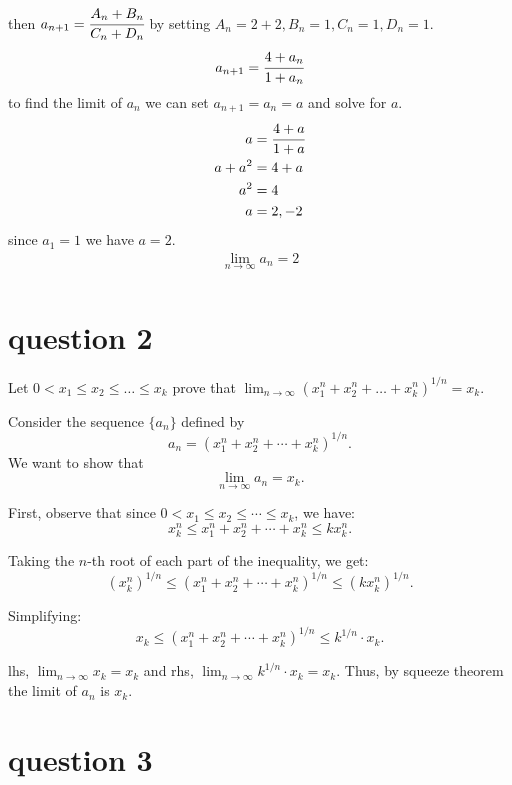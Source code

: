 \documentclass{article}
\begin{document}
    then $a_{n + 1} = \cfrac{A_n + B_n}{C_n + D_n}$ by setting $A_n = 2 + 2, B_n = 1, C_n = 1, D_n = 1$.
    \begin{align*}
        a_{n+1} &= \cfrac{4 + a_n}{1 + a_n} \\
    \end{align*}
    to find the limit of $a_n$ we can set $a_{n+1} = a_n = a$ and solve for $a$.
    \begin{align*}
        a &= \cfrac{4 + a}{1 + a} \\
        a + a^2 &= 4 + a \\
        a^2 &= 4 \\
        a &= 2, -2 \\
    \end{align*}
    since $a_1 = 1$ we have $a = 2$.
    \begin{align*}
        \lim_{n \to \infty} a_n = 2 \\
    \end{align*}

\section{question 2}


Let $0 < x_1 \leq x_2 \leq \dots \leq x_k$ prove that $\lim_{n \to \infty} (x_{1}^n + x_{2}^n + \dots + x_{k}^n)^{1/n} = x_k$.
\begin{proofbox}
    Consider the sequence \(\{a_n\}\) defined by
    \[
    a_n = (x_1^n + x_2^n + \cdots + x_k^n)^{1/n}.
    \]
    We want to show that
    \[
    \lim_{n \to \infty} a_n = x_k.
    \]
    
    First, observe that since \(0 < x_1 \leq x_2 \leq \cdots \leq x_k\), we have:
    \[
    x_k^n \leq x_1^n + x_2^n + \cdots + x_k^n \leq kx_k^n.
    \]
    
    Taking the \(n\)-th root of each part of the inequality, we get:
    \[
    (x_k^n)^{1/n} \leq (x_1^n + x_2^n + \cdots + x_k^n)^{1/n} \leq (kx_k^n)^{1/n}.
    \]
    
    Simplifying:
    \[
    x_k \leq (x_1^n + x_2^n + \cdots + x_k^n)^{1/n} \leq k^{1/n} \cdot x_k.
    \]
        
    lhs, $\lim_{n \to \infty} x_k = x_k$ and rhs, $\lim_{n \to \infty} k^{1/n} \cdot x_k = x_k$. Thus, by squeeze theorem the limit of \(a_n\) is \(x_k\).


\end{proofbox}

\section{question 3}
\end{document}
